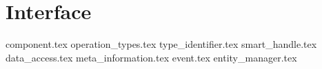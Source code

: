 \section{Interface}
{component.tex}
{operation_types.tex}
{type_identifier.tex}
{smart_handle.tex}
{data_access.tex}
{meta_information.tex}
{event.tex}
{entity_manager.tex}

